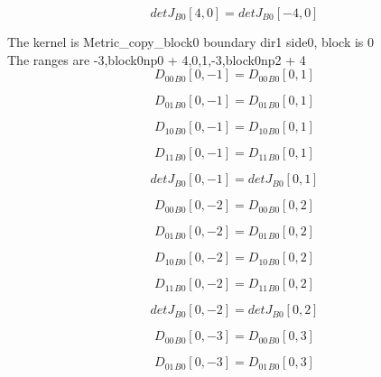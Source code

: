 \documentclass{article}
\begin{document}
\begin{dmath}{detJ{_{B0}}}[{4,0}] = {detJ{_{B0}}}[{-4,0}]\end{dmath}

\noindent The kernel is Metric_copy_block0 boundary dir1 side0, block is 0\\\noindent The ranges are -3,block0np0 + 4,0,1,-3,block0np2 + 4\\\begin{dmath}{D_{00}{_{B0}}}[{0,-1}] = {D_{00}{_{B0}}}[{0,1}]\end{dmath}

\begin{dmath}{D_{01}{_{B0}}}[{0,-1}] = {D_{01}{_{B0}}}[{0,1}]\end{dmath}

\begin{dmath}{D_{10}{_{B0}}}[{0,-1}] = {D_{10}{_{B0}}}[{0,1}]\end{dmath}

\begin{dmath}{D_{11}{_{B0}}}[{0,-1}] = {D_{11}{_{B0}}}[{0,1}]\end{dmath}

\begin{dmath}{detJ{_{B0}}}[{0,-1}] = {detJ{_{B0}}}[{0,1}]\end{dmath}

\begin{dmath}{D_{00}{_{B0}}}[{0,-2}] = {D_{00}{_{B0}}}[{0,2}]\end{dmath}

\begin{dmath}{D_{01}{_{B0}}}[{0,-2}] = {D_{01}{_{B0}}}[{0,2}]\end{dmath}

\begin{dmath}{D_{10}{_{B0}}}[{0,-2}] = {D_{10}{_{B0}}}[{0,2}]\end{dmath}

\begin{dmath}{D_{11}{_{B0}}}[{0,-2}] = {D_{11}{_{B0}}}[{0,2}]\end{dmath}

\begin{dmath}{detJ{_{B0}}}[{0,-2}] = {detJ{_{B0}}}[{0,2}]\end{dmath}

\begin{dmath}{D_{00}{_{B0}}}[{0,-3}] = {D_{00}{_{B0}}}[{0,3}]\end{dmath}

\begin{dmath}{D_{01}{_{B0}}}[{0,-3}] = {D_{01}{_{B0}}}[{0,3}]\end{dmath}
\end{document}
